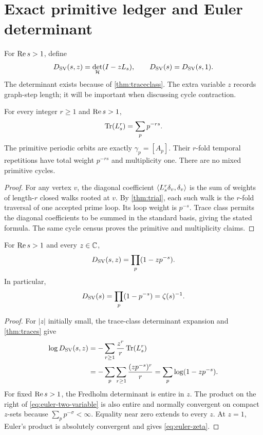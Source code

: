 \section{Exact primitive ledger and Euler determinant}
\label{sec:euler}

For $\operatorname{Re} s>1$, define
\[
D_{\mathrm{SV}}(s,z)=\det_{\mathcal H}(I-zL_s),
\qquad
D_{\mathrm{SV}}(s)=D_{\mathrm{SV}}(s,1).
\]
The determinant exists because of \cref{thm:traceclass}.  The extra variable
$z$ records graph-step length; it will be important when discussing cycle
contraction.

\begin{theorem}
\label{thm:traces}
For every integer $r\ge1$ and $\operatorname{Re} s>1$,
\[
\operatorname{Tr}(L_s^r)=\sum_p p^{-rs}.
\]
The primitive periodic orbits are exactly
$\gamma_p=[A_p]$.  Their $r$-fold temporal repetitions have total weight
$p^{-rs}$ and multiplicity one.  There are no mixed primitive cycles.
\end{theorem}

\begin{proof}
For any vertex $v$, the diagonal coefficient
$\left\langle L_s^r\delta_v,\delta_v\right\rangle$ is the sum of weights of length-$r$ closed
walks rooted at $v$.  By \cref{thm:trial}, each such walk is the $r$-fold
traversal of one accepted prime loop.  Its loop weight is $p^{-s}$.
Trace class permits the diagonal coefficients to be summed in the standard
basis, giving the stated formula.  The same cycle census proves the
primitive and multiplicity claims.
\end{proof}

\begin{theorem}
\label{thm:euler}
For $\operatorname{Re} s>1$ and every $z\in\mathbb C$,
\begin{equation}
D_{\mathrm{SV}}(s,z)=\prod_p(1-zp^{-s}).
\label{eq:euler-two-variable}
\end{equation}
In particular,
\begin{equation}
D_{\mathrm{SV}}(s)=\prod_p(1-p^{-s})=\zeta(s)^{-1}.
\label{eq:euler-zeta}
\end{equation}
\end{theorem}

\begin{proof}
For $|z|$ initially small, the trace-class determinant expansion and
\cref{thm:traces} give
\[
\begin{aligned}
\log D_{\mathrm{SV}}(s,z)
&=-\sum_{r\ge1}\frac{z^r}{r}\operatorname{Tr}(L_s^r)\\
&=-\sum_p\sum_{r\ge1}\frac{(zp^{-s})^r}{r}
=\sum_p\log(1-zp^{-s}).
\end{aligned}
\]
For fixed $\operatorname{Re} s>1$, the Fredholm determinant is entire in $z$.  The
product on the right of \eqref{eq:euler-two-variable} is also entire and
normally convergent on compact $z$-sets because $\sum_pp^{-\sigma}<\infty$.
Equality near zero extends to every $z$.  At $z=1$, Euler's product is
absolutely convergent and gives \eqref{eq:euler-zeta}.
\end{proof}

